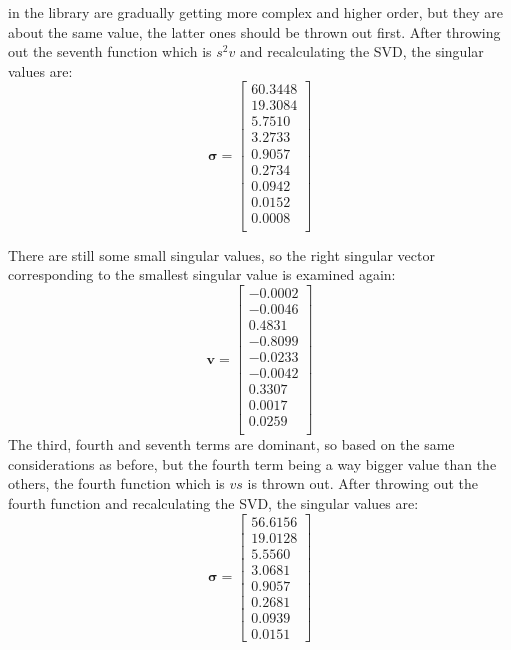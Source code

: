 ﻿\documentclass[12pt,a4paper]{article}
\begin{document}
in the library are gradually getting more complex and higher order,
but they are about the same value,
the latter ones should be thrown out first. After throwing out the seventh
function which is $s^2v$ and recalculating the SVD, the singular values are:
\begin{equation}
    \bm{\sigma} = \begin{bmatrix}
    60.3448 \\
    19.3084 \\
    5.7510 \\
    3.2733 \\
    0.9057 \\
    0.2734 \\
    0.0942 \\
    0.0152 \\
    0.0008 \\
    \end{bmatrix}
\end{equation}




There are still some small singular values, so the right singular vector 
corresponding to the smallest singular value is examined again:
\begin{equation}
    \bm{v} = \begin{bmatrix}
    -0.0002 \\
    -0.0046 \\
    0.4831 \\
    -0.8099 \\
    -0.0233 \\
    -0.0042 \\
    0.3307 \\
    0.0017 \\
    0.0259 \\
    \end{bmatrix}
\end{equation}
The third, fourth and seventh terms are dominant, so based on the same considerations as before,
but the fourth term being a way bigger value than the others,
the fourth function which is $vs$ is thrown out. After throwing out the fourth function
and recalculating the SVD, the singular values are: 
\begin{equation}
    \bm{\sigma} = \begin{bmatrix}
    56.6156 \\
    19.0128 \\
    5.5560 \\
    3.0681 \\
    0.9057 \\
    0.2681 \\
    0.0939 \\
    0.0151
    \end{bmatrix}
\end{equation}
\end{document}
